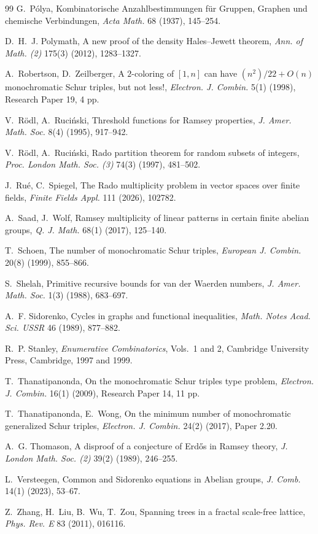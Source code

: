 \documentclass[twoside,12pt]{article}
\newcommand{\1}{\mathbf 1}
\begin{document}
\begin{thebibliography}{99}
G.~P\'olya,
Kombinatorische Anzahlbestimmungen f\"ur Gruppen, Graphen und chemische
Verbindungen,
\emph{Acta Math.} 68 (1937), 145--254.

D.~H.~J. Polymath,
A new proof of the density Hales--Jewett theorem,
\emph{Ann. of Math. (2)} 175(3) (2012), 1283--1327.

A.~Robertson, D.~Zeilberger,
A \(2\)-coloring of \([1,n]\) can have \((n^2)/22+O(n)\) monochromatic Schur triples, but not less!,
\emph{Electron. J. Combin.} 5(1) (1998), Research Paper 19, 4 pp.

V.~R\"odl, A.~Ruci\'nski,
Threshold functions for Ramsey properties,
\emph{J. Amer. Math. Soc.} 8(4) (1995), 917--942.

V.~R\"odl, A.~Ruci\'nski,
Rado partition theorem for random subsets of integers,
\emph{Proc. London Math. Soc. (3)} 74(3) (1997), 481--502.

J.~Ru\'e, C.~Spiegel,
The Rado multiplicity problem in vector spaces over finite fields,
\emph{Finite Fields Appl.} 111 (2026), 102782.

A.~Saad, J.~Wolf,
Ramsey multiplicity of linear patterns in certain finite abelian groups,
\emph{Q. J. Math.} 68(1) (2017), 125--140.

T.~Schoen,
The number of monochromatic Schur triples,
\emph{European J. Combin.} 20(8) (1999), 855--866.

S.~Shelah,
Primitive recursive bounds for van der Waerden numbers,
\emph{J. Amer. Math. Soc.} 1(3) (1988), 683--697.

A.~F. Sidorenko,
Cycles in graphs and functional inequalities,
\emph{Math. Notes Acad. Sci. USSR} 46 (1989), 877--882.

R.~P. Stanley,
\emph{Enumerative Combinatorics},
Vols.~1 and 2,
Cambridge University Press, Cambridge, 1997 and 1999.

T.~Thanatipanonda,
On the monochromatic Schur triples type problem,
\emph{Electron. J. Combin.} 16(1) (2009), Research Paper 14, 11 pp.

T.~Thanatipanonda, E.~Wong,
On the minimum number of monochromatic generalized Schur triples,
\emph{Electron. J. Combin.} 24(2) (2017), Paper 2.20.

A.~G. Thomason,
A disproof of a conjecture of Erd\H{o}s in Ramsey theory,
\emph{J. London Math. Soc. (2)} 39(2) (1989), 246--255.

L.~Versteegen,
Common and Sidorenko equations in Abelian groups,
\emph{J. Comb.} 14(1) (2023), 53--67.

Z.~Zhang, H.~Liu, B.~Wu, T.~Zou,
Spanning trees in a fractal scale-free lattice,
\emph{Phys. Rev. E} 83 (2011), 016116.

\end{thebibliography}
\end{document}
